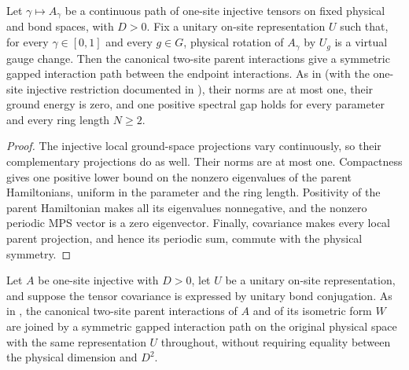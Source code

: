 \begin{lemma}
    \label{thm:spt_canonical_injective_gapped_path}
    \leanok
    Let $\gamma\mapsto A_\gamma$ be a continuous path of one-site injective
    tensors on fixed physical and bond spaces, with $D>0$. Fix a unitary
    on-site representation $U$ such that, for every $\gamma\in[0,1]$ and
    every $g\in G$, physical rotation of $A_\gamma$ by $U_g$ is a virtual
    gauge change. Then the canonical two-site parent interactions give a
    symmetric gapped interaction path between the endpoint interactions.
    As in \cite[Section~II.C and Appendix~A]{Schuch2011Phases} (with the
    one-site injective restriction documented in
    \cite{gap:spc11_uniform_gap_injective_scope}), their norms are at most
    one, their ground energy is zero, and one positive spectral gap holds
    for every parameter and every ring length $N\geq2$.
\end{lemma}

\begin{proof}\leanok
    The injective local ground-space projections vary continuously, so their
    complementary projections do as well. Their norms are at most one.
    Compactness gives one positive lower bound on the nonzero eigenvalues of
    the parent Hamiltonians, uniform in the parameter and the ring length.
    Positivity of the parent Hamiltonian makes all its eigenvalues
    nonnegative, and the nonzero periodic MPS vector is a zero eigenvector. Finally, covariance
    makes every local parent projection, and hence its periodic sum,
    commute with the physical symmetry.
\end{proof}

\begin{definition}
    \label{def:spt_polar_gapped_interaction_path}
    \leanok
    Let $A$ be one-site injective with $D>0$, let $U$ be a unitary on-site
    representation, and suppose the tensor covariance is expressed by
    unitary bond conjugation. As in
    \cite[Section~II.C, isometric form and symmetries]{Schuch2011Phases},
    the canonical two-site parent interactions of $A$ and of its isometric
    form $W$ are joined by a symmetric gapped interaction path on the
    original physical space with the same representation $U$ throughout,
    without requiring equality between the physical dimension and $D^2$.
\end{definition}

